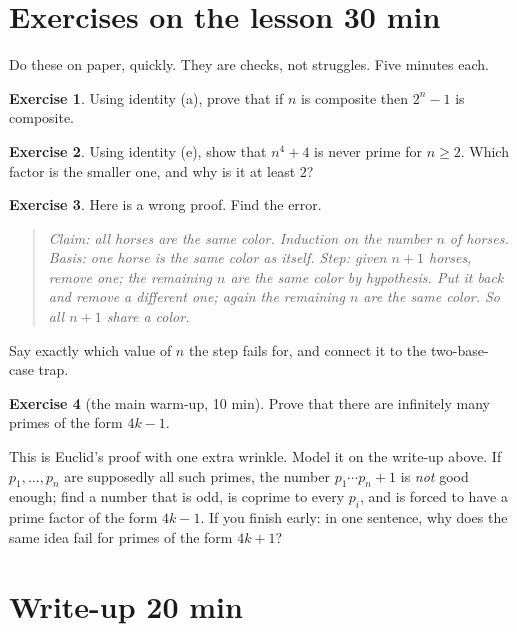 \documentclass[11pt]{article}
\theoremstyle{plain}
\theoremstyle{definition}
\newtheorem{exercise}{Exercise}
\begin{document}
\section{Exercises on the lesson \hfill 30 min}

Do these on paper, quickly. They are checks, not struggles. Five minutes each.

\begin{exercise}
Using identity (a), prove that if $n$ is composite then $2^n - 1$ is composite.
\end{exercise}

\begin{exercise}
Using identity (e), show that $n^4 + 4$ is never prime for $n \ge 2$. Which factor is the smaller one, and why is it at least $2$?
\end{exercise}

\begin{exercise}
Here is a wrong proof. Find the error.
\begin{quote}
\textit{Claim: all horses are the same color. Induction on the number $n$ of horses. Basis: one horse is the same color as itself. Step: given $n+1$ horses, remove one; the remaining $n$ are the same color by hypothesis. Put it back and remove a different one; again the remaining $n$ are the same color. So all $n+1$ share a color.}
\end{quote}
Say exactly which value of $n$ the step fails for, and connect it to the two-base-case trap.
\end{exercise}

\begin{exercise}[the main warm-up, 10 min]
Prove that there are infinitely many primes of the form $4k - 1$.
\end{exercise}
This is Euclid's proof with one extra wrinkle. Model it on the write-up above. If $p_1, \dots, p_n$ are supposedly all such primes, the number $p_1 \cdots p_n + 1$ is \emph{not} good enough; find a number that is odd, is coprime to every $p_i$, and is forced to have a prime factor of the form $4k-1$. If you finish early: in one sentence, why does the same idea fail for primes of the form $4k + 1$?

\section{Write-up \hfill 20 min}
\end{document}

